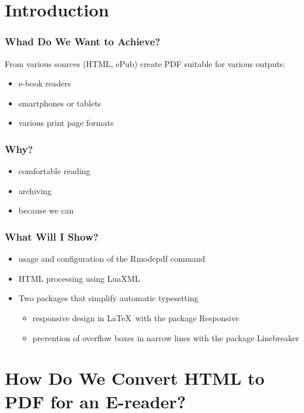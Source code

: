\mode*
\section{Introduction}
\frenchspacing

\begin{frame}
  \frametitle{Whad Do We Want to Achieve?}
    From various sources (HTML, ePub) create PDF suitable for various outputs:
    \begin{itemize}
      \item e-book readers
      \item smartphones or tablets
      \item various print page formats
    \end{itemize}

  \end{frame}
  \begin{frame}
    \frametitle{Why?}

    \begin{itemize}
      \item comfortable reading
      \item archiving
      \item because we can
    \end{itemize}


\end{frame}

\begin{frame}[fragile]
  \frametitle{What Will I Show?}
  \begin{itemize}
    \item usage and configuration of the Rmodepdf command
    \item HTML processing using LuaXML
    \item Two packages that simplify automatic typesetting
      \begin{itemize}
        \item responsive design in \LaTeX\ with the package Responsive
        \item prevention of overflow boxes in narrow lines with the package Linebreaker
      \end{itemize}

  \end{itemize}

\end{frame}


\section{How Do We Convert HTML to PDF for an E-reader?}

